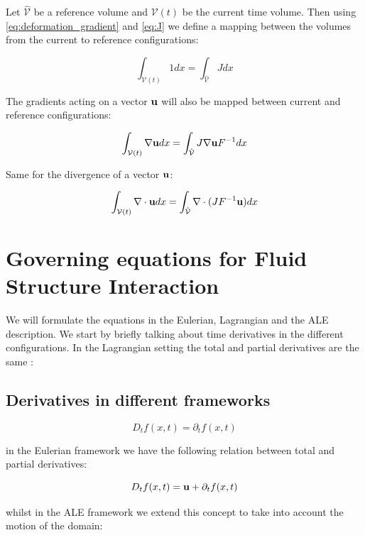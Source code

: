 Let $\hat{\mathcal{V}}$ be a reference volume and $\mathcal{V}(t)$ be the current time volume. Then using \eqref{eq:deformation_gradient} and \eqref{eq:J} we define a mapping between the volumes from the current to reference configurations:

\begin{equation}
 \int_{\mathcal{V}(t)} 1  dx = \int_{\hat{\mathcal{V}}} J dx  
\end{equation}

The gradients acting on a vector $ \bold{u} $ will also be mapped between current and reference configurations:

\begin{equation}
\int_{\mathcal{V}(t)} \nabla \bold{u}   dx = \int_{\hat{\mathcal{V}}} J  \nabla \bold{u}F^{-1} dx  
\end{equation}

Same for the divergence of a vector $ \bold{u}$:

\begin{equation}
\int_{\mathcal{V}(t)} \nabla \cdot \bold{u}   dx = \int_{\hat{\mathcal{V}}} \nabla \cdot( J  F^{-1} \bold{u}) dx  
\end{equation}

\section{Governing equations for Fluid Structure Interaction}

We will formulate the equations in the Eulerian, Lagrangian and the ALE description. We start by briefly talking about time derivatives in the different configurations. In the Lagrangian setting the total and partial derivatives are the same \cite{Wick2011}:

\subsection{Derivatives in different frameworks}
\begin{equation}
D_t f(x,t) = \partial_t f(x,t)
\end{equation}

in the Eulerian framework we have the following relation between total and partial derivatives:

\begin{equation}
D_t f(x,t) = \bold{u} + \partial_t f(x,t)
\end{equation}

whilst in the ALE framework we extend this concept to take into account the motion of the domain:

